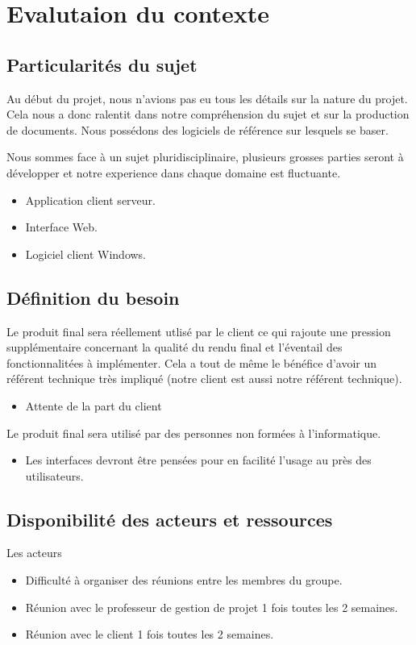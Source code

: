 \chapter{Evalutaion du contexte}

\section{Particularités du sujet}
Au début du projet, nous n'avions pas eu tous les détails sur la nature du projet. Cela nous a donc ralentit
dans notre compréhension du sujet et sur la production de documents.
Nous possédons des logiciels de référence sur lesquels se baser.\\ \newline

Nous sommes face à un sujet pluridisciplinaire, plusieurs grosses parties seront à 
développer et notre experience dans chaque domaine est fluctuante.
\begin{itemize}
	\item Application client serveur.
	\item Interface Web.
	\item Logiciel client Windows.
\end{itemize}

\section{Définition du besoin}

Le produit final sera réellement utlisé par le client ce qui rajoute une pression supplémentaire concernant la qualité 
du rendu final et l'éventail des fonctionnalitées à implémenter. Cela a tout de même le bénéfice d'avoir un référent 
technique très impliqué (notre client est aussi notre référent technique).
\begin{itemize}
	\item Attente de la part du client
\end{itemize}

Le produit final sera utilisé par des personnes non formées à l'informatique. 
\begin{itemize}	
	\item Les interfaces devront être pensées pour en facilité l'usage au près des utilisateurs.\newline
\end{itemize}

\section{Disponibilité des acteurs et ressources}
Les acteurs
\begin{itemize}
	\item Difficulté à organiser des réunions entre les membres du groupe.
	\item Réunion avec le professeur de gestion de projet 1 fois toutes les 2 semaines. 
	\item Réunion avec le client 1 fois toutes les 2 semaines.\newline
\end{itemize}

